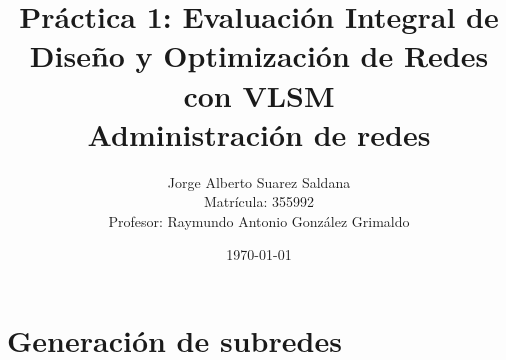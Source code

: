 \documentclass[12pt]{article}
\title{
Práctica 1: Evaluación Integral de Diseño y Optimización de Redes con VLSM\\[0.5em]
\large Administración de redes
}
\author{
Jorge Alberto Suarez Saldana\\
\small Matrícula: 355992\\
\small Profesor: Raymundo Antonio González Grimaldo
}
\date{\today}
\begin{document}
\maketitle

\section{Generación de subredes}
\end{document}
